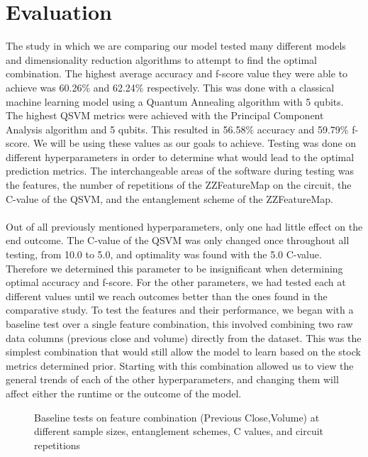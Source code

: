 \documentclass{article}
\begin{document}
\section*{Evaluation}
The study in which we are comparing our model tested many different models and dimensionality reduction algorithms to attempt to find the optimal combination. The highest average accuracy and f-score value they were able to achieve was 60.26\% and 62.24\% respectively. This was done with a classical machine learning model using a Quantum Annealing algorithm with 5 qubits. The highest QSVM metrics were achieved with the Principal Component Analysis algorithm and 5 qubits. This resulted in 56.58\% accuracy and 59.79\% f-score. We will be using these values as our goals to achieve. Testing was done on different hyperparameters in order to determine what would lead to the optimal prediction metrics. The interchangeable areas of the software during testing was the features, the number of repetitions of the ZZFeatureMap on the circuit, the C-value of the QSVM, and the entanglement scheme of the ZZFeatureMap.
\\
\\
Out of all previously mentioned hyperparameters, only one had little effect on the end outcome. The C-value of the QSVM was only changed once throughout all testing, from 10.0 to 5.0, and optimality was found with the 5.0 C-value. Therefore we determined this parameter to be insignificant when determining optimal accuracy and f-score. For the other parameters, we had tested each at different values until we reach outcomes better than the ones found in the comparative study. To test the features and their performance, we began with a baseline test over a single feature combination, this involved combining two raw data columns (previous close and volume) directly from the dataset. This was the simplest combination that would still allow the model to learn based on the stock metrics determined prior. Starting with this combination allowed us to view the general trends of each of the other hyperparameters, and changing them will affect either the runtime or the outcome of the model. 
\begin{figure}[H]
    \centering
    \caption{Baseline tests on feature combination (Previous Close,Volume) at different sample sizes, entanglement schemes, C values, and circuit repetitions}
    \label{fig:5}
\end{figure}
\end{document}
